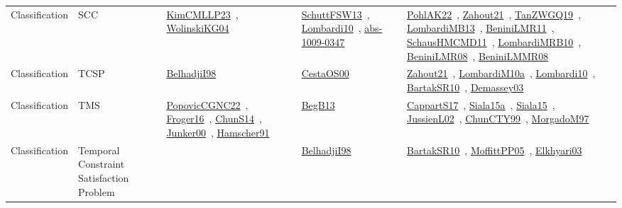 {\begin{longtable}{lp{3cm}>{\raggedright\arraybackslash}p{6cm}>{\raggedright\arraybackslash}p{6cm}>{\raggedright\arraybackslash}p{8cm}}
Classification & SCC & \href{../works/KimCMLLP23.pdf}{KimCMLLP23}~\cite{KimCMLLP23}, \href{../works/WolinskiKG04.pdf}{WolinskiKG04}~\cite{WolinskiKG04} & \href{../works/SchuttFSW13.pdf}{SchuttFSW13}~\cite{SchuttFSW13}, \href{../works/Lombardi10.pdf}{Lombardi10}~\cite{Lombardi10}, \href{../works/abs-1009-0347.pdf}{abs-1009-0347}~\cite{abs-1009-0347} & \href{../works/PohlAK22.pdf}{PohlAK22}~\cite{PohlAK22}, \href{../works/Zahout21.pdf}{Zahout21}~\cite{Zahout21}, \href{../works/TanZWGQ19.pdf}{TanZWGQ19}~\cite{TanZWGQ19}, \href{../works/LombardiMB13.pdf}{LombardiMB13}~\cite{LombardiMB13}, \href{../works/BeniniLMR11.pdf}{BeniniLMR11}~\cite{BeniniLMR11}, \href{../works/SchausHMCMD11.pdf}{SchausHMCMD11}~\cite{SchausHMCMD11}, \href{../works/LombardiMRB10.pdf}{LombardiMRB10}~\cite{LombardiMRB10}, \href{../works/BeniniLMR08.pdf}{BeniniLMR08}~\cite{BeniniLMR08}, \href{../works/BeniniLMMR08.pdf}{BeniniLMMR08}~\cite{BeniniLMMR08}\\
Classification & TCSP & \href{../works/BelhadjiI98.pdf}{BelhadjiI98}~\cite{BelhadjiI98} & \href{../works/CestaOS00.pdf}{CestaOS00}~\cite{CestaOS00} & \href{../works/Zahout21.pdf}{Zahout21}~\cite{Zahout21}, \href{../works/LombardiM10a.pdf}{LombardiM10a}~\cite{LombardiM10a}, \href{../works/Lombardi10.pdf}{Lombardi10}~\cite{Lombardi10}, \href{../works/BartakSR10.pdf}{BartakSR10}~\cite{BartakSR10}, \href{../works/Demassey03.pdf}{Demassey03}~\cite{Demassey03}\\
Classification & TMS & \href{../works/PopovicCGNC22.pdf}{PopovicCGNC22}~\cite{PopovicCGNC22}, \href{../works/Froger16.pdf}{Froger16}~\cite{Froger16}, \href{../works/ChunS14.pdf}{ChunS14}~\cite{ChunS14}, \href{../works/Junker00.pdf}{Junker00}~\cite{Junker00}, \href{../works/Hamscher91.pdf}{Hamscher91}~\cite{Hamscher91} & \href{../works/BegB13.pdf}{BegB13}~\cite{BegB13} & \href{../works/CappartS17.pdf}{CappartS17}~\cite{CappartS17}, \href{../works/Siala15a.pdf}{Siala15a}~\cite{Siala15a}, \href{../works/Siala15.pdf}{Siala15}~\cite{Siala15}, \href{../works/JussienL02.pdf}{JussienL02}~\cite{JussienL02}, \href{../works/ChunCTY99.pdf}{ChunCTY99}~\cite{ChunCTY99}, \href{../works/MorgadoM97.pdf}{MorgadoM97}~\cite{MorgadoM97}\\
Classification & Temporal Constraint Satisfaction Problem &  & \href{../works/BelhadjiI98.pdf}{BelhadjiI98}~\cite{BelhadjiI98} & \href{../works/BartakSR10.pdf}{BartakSR10}~\cite{BartakSR10}, \href{../works/MoffittPP05.pdf}{MoffittPP05}~\cite{MoffittPP05}, \href{../works/Elkhyari03.pdf}{Elkhyari03}~\cite{Elkhyari03}\\

\end{longtable}}

